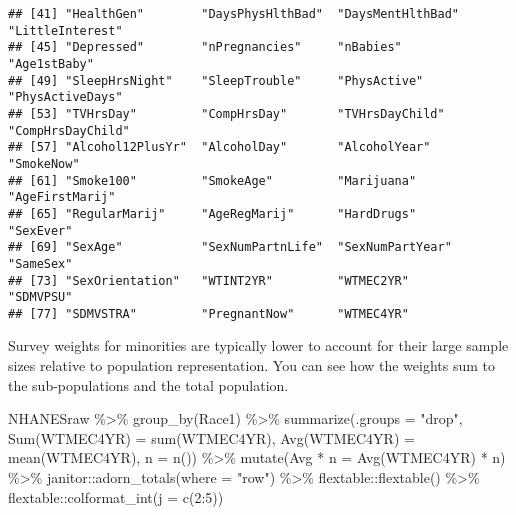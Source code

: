 \documentclass[
]{book}
\newenvironment{Shaded}{\begin{snugshade}}{\end{snugshade}}
\newcommand{\AttributeTok}[1]{\textcolor[rgb]{0.77,0.63,0.00}{#1}}
\newcommand{\DecValTok}[1]{\textcolor[rgb]{0.00,0.00,0.81}{#1}}
\newcommand{\FunctionTok}[1]{\textcolor[rgb]{0.00,0.00,0.00}{#1}}
\newcommand{\NormalTok}[1]{#1}
\newcommand{\OtherTok}[1]{\textcolor[rgb]{0.56,0.35,0.01}{#1}}
\newcommand{\SpecialCharTok}[1]{\textcolor[rgb]{0.00,0.00,0.00}{#1}}
\newcommand{\StringTok}[1]{\textcolor[rgb]{0.31,0.60,0.02}{#1}}
\theoremstyle{definition}
\theoremstyle{definition}
\theoremstyle{definition}
\theoremstyle{definition}
\theoremstyle{remark}
\begin{document}
\begin{verbatim}
## [41] "HealthGen"        "DaysPhysHlthBad"  "DaysMentHlthBad"  "LittleInterest"  
## [45] "Depressed"        "nPregnancies"     "nBabies"          "Age1stBaby"      
## [49] "SleepHrsNight"    "SleepTrouble"     "PhysActive"       "PhysActiveDays"  
## [53] "TVHrsDay"         "CompHrsDay"       "TVHrsDayChild"    "CompHrsDayChild" 
## [57] "Alcohol12PlusYr"  "AlcoholDay"       "AlcoholYear"      "SmokeNow"        
## [61] "Smoke100"         "SmokeAge"         "Marijuana"        "AgeFirstMarij"   
## [65] "RegularMarij"     "AgeRegMarij"      "HardDrugs"        "SexEver"         
## [69] "SexAge"           "SexNumPartnLife"  "SexNumPartYear"   "SameSex"         
## [73] "SexOrientation"   "WTINT2YR"         "WTMEC2YR"         "SDMVPSU"         
## [77] "SDMVSTRA"         "PregnantNow"      "WTMEC4YR"
\end{verbatim}

Survey weights for minorities are typically lower to account for their large sample sizes relative to population representation. You can see how the weights sum to the sub-populations and the total population.

\begin{Shaded}
\begin{Highlighting}[]
\NormalTok{NHANESraw }\SpecialCharTok{\%\textgreater{}\%} 
  \FunctionTok{group\_by}\NormalTok{(Race1) }\SpecialCharTok{\%\textgreater{}\%} 
  \FunctionTok{summarize}\NormalTok{(}\AttributeTok{.groups =} \StringTok{"drop"}\NormalTok{, }
            \StringTok{\textasciigrave{}}\AttributeTok{Sum(WTMEC4YR)}\StringTok{\textasciigrave{}} \OtherTok{=} \FunctionTok{sum}\NormalTok{(WTMEC4YR), }
            \StringTok{\textasciigrave{}}\AttributeTok{Avg(WTMEC4YR)}\StringTok{\textasciigrave{}} \OtherTok{=} \FunctionTok{mean}\NormalTok{(WTMEC4YR), }
            \AttributeTok{n =} \FunctionTok{n}\NormalTok{()) }\SpecialCharTok{\%\textgreater{}\%}
  \FunctionTok{mutate}\NormalTok{(}\StringTok{\textasciigrave{}}\AttributeTok{Avg * n}\StringTok{\textasciigrave{}} \OtherTok{=} \StringTok{\textasciigrave{}}\AttributeTok{Avg(WTMEC4YR)}\StringTok{\textasciigrave{}} \SpecialCharTok{*}\NormalTok{ n) }\SpecialCharTok{\%\textgreater{}\%}
\NormalTok{  janitor}\SpecialCharTok{::}\FunctionTok{adorn\_totals}\NormalTok{(}\AttributeTok{where =} \StringTok{"row"}\NormalTok{) }\SpecialCharTok{\%\textgreater{}\%}
\NormalTok{  flextable}\SpecialCharTok{::}\FunctionTok{flextable}\NormalTok{() }\SpecialCharTok{\%\textgreater{}\%}
\NormalTok{  flextable}\SpecialCharTok{::}\FunctionTok{colformat\_int}\NormalTok{(}\AttributeTok{j =} \FunctionTok{c}\NormalTok{(}\DecValTok{2}\SpecialCharTok{:}\DecValTok{5}\NormalTok{))}
\end{Highlighting}
\end{Shaded}
\end{document}
